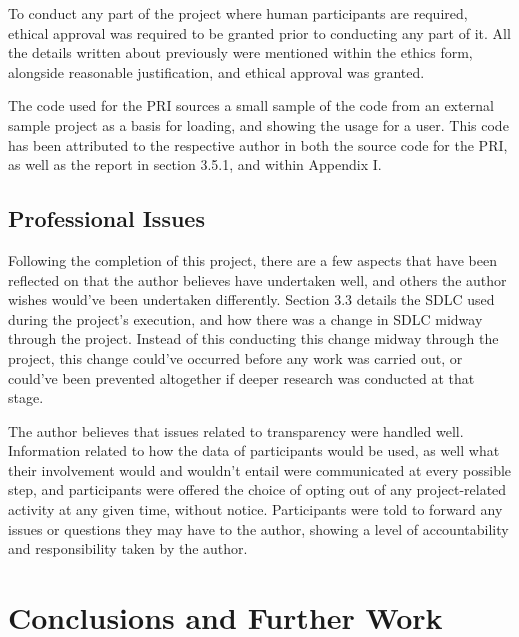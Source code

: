 \documentclass[12pt]{article}
\begin{document}
To conduct any part of the project where human participants are required, ethical approval was required to be granted 
prior to conducting any part of it. All the details written about previously were mentioned within the ethics form, alongside reasonable 
justification, and ethical approval was granted.

The code used for the PRI sources a small sample of the code from an external sample project as a basis for loading, and showing the usage for
a user. This code has been attributed to the respective author in both the source code for the PRI, as well as the report in section 3.5.1, and
within Appendix I.

\subsection{Professional Issues}
Following the completion of this project, there are a few aspects that have been reflected on that the author believes have undertaken well, and
others the author wishes would've been undertaken differently. Section 3.3 details the SDLC used during the project's execution, and 
how there was a change in SDLC midway through the project. Instead of this conducting this change midway through the project, this change 
could've occurred before any work was carried out, or could've been prevented altogether if deeper research was conducted at that stage. \newline

The author believes that issues related to transparency were handled well. Information related to how the data of participants would be used, as
well what their involvement would and wouldn't entail were communicated at every possible step, and participants were offered the choice of 
opting out of any project-related activity at any given time, without notice. Participants were told to forward any issues or questions they
may have to the author, showing a level of accountability and responsibility taken by the author. 


\newpage
\section{Conclusions and Further Work}
\end{document}
